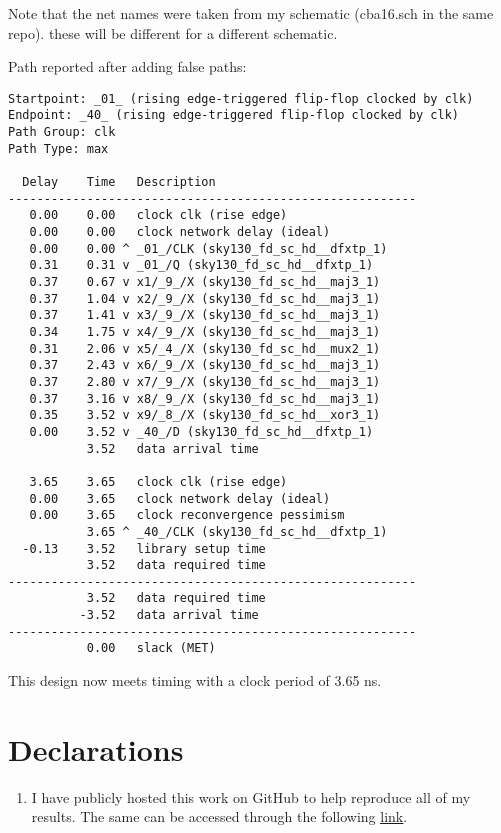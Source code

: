 \documentclass[12pt,a4paper]{article}
\begin{document}
\noindent Note that the net names were taken from my schematic (cba16.sch in the same repo). these will be different for a different schematic.

Path reported after adding false paths:

\begin{verbatim}
Startpoint: _01_ (rising edge-triggered flip-flop clocked by clk)
Endpoint: _40_ (rising edge-triggered flip-flop clocked by clk)
Path Group: clk
Path Type: max

  Delay    Time   Description
---------------------------------------------------------
   0.00    0.00   clock clk (rise edge)
   0.00    0.00   clock network delay (ideal)
   0.00    0.00 ^ _01_/CLK (sky130_fd_sc_hd__dfxtp_1)
   0.31    0.31 v _01_/Q (sky130_fd_sc_hd__dfxtp_1)
   0.37    0.67 v x1/_9_/X (sky130_fd_sc_hd__maj3_1)
   0.37    1.04 v x2/_9_/X (sky130_fd_sc_hd__maj3_1)
   0.37    1.41 v x3/_9_/X (sky130_fd_sc_hd__maj3_1)
   0.34    1.75 v x4/_9_/X (sky130_fd_sc_hd__maj3_1)
   0.31    2.06 v x5/_4_/X (sky130_fd_sc_hd__mux2_1)
   0.37    2.43 v x6/_9_/X (sky130_fd_sc_hd__maj3_1)
   0.37    2.80 v x7/_9_/X (sky130_fd_sc_hd__maj3_1)
   0.37    3.16 v x8/_9_/X (sky130_fd_sc_hd__maj3_1)
   0.35    3.52 v x9/_8_/X (sky130_fd_sc_hd__xor3_1)
   0.00    3.52 v _40_/D (sky130_fd_sc_hd__dfxtp_1)
           3.52   data arrival time

   3.65    3.65   clock clk (rise edge)
   0.00    3.65   clock network delay (ideal)
   0.00    3.65   clock reconvergence pessimism
           3.65 ^ _40_/CLK (sky130_fd_sc_hd__dfxtp_1)
  -0.13    3.52   library setup time
           3.52   data required time
---------------------------------------------------------
           3.52   data required time
          -3.52   data arrival time
---------------------------------------------------------
           0.00   slack (MET)
\end{verbatim}

\noindent This design now meets timing with a clock period of 3.65 ns.

\section{Declarations}
\begin{enumerate}
    \item I have publicly hosted this work on GitHub to help reproduce all of my results. The same can be accessed through the following \href{https://github.com/iamkarthikbk/ee5311-2025}{\underline{link}}.
\end{enumerate}
\end{document}
